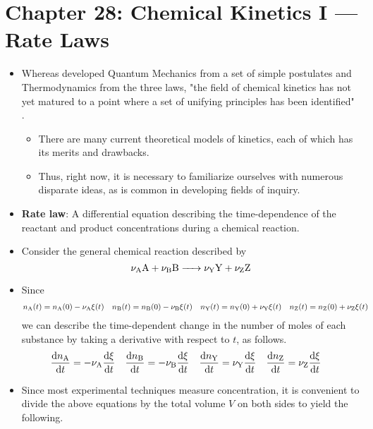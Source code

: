 \documentclass[../notes.tex]{subfiles}
\begin{document}
\section{Chapter 28: Chemical Kinetics I --- Rate Laws}
\begin{itemize}
    \item Whereas \textcite{bib:McQuarrieSimon} developed Quantum Mechanics from a set of simple postulates and Thermodynamics from the three laws, "the field of chemical kinetics has not yet matured to a point where a set of unifying principles has been identified" \parencite[1047]{bib:McQuarrieSimon}.
    \begin{itemize}
        \item There are many current theoretical models of kinetics, each of which has its merits and drawbacks.
        \item Thus, right now, it is necessary to familiarize ourselves with numerous disparate ideas, as is common in developing fields of inquiry.
    \end{itemize}
    \item \textbf{Rate law}: A differential equation describing the time-dependence of the reactant and product concentrations during a chemical reaction.
    \item Consider the general chemical reaction described by
    \begin{equation*}
        \ce{$\nu_{\text{A}}$A + $\nu_{\text{B}}$B -> $\nu_{\text{Y}}$Y + $\nu_{\text{Z}}$Z}
    \end{equation*}
    \item Since
    \begin{align*}
        n_{\ce{A}}(t) &= n_{\ce{A}}(0)-\nu_{\ce{A}}\xi(t)&
        n_{\ce{B}}(t) &= n_{\ce{B}}(0)-\nu_{\ce{B}}\xi(t)&
        n_{\ce{Y}}(t) &= n_{\ce{Y}}(0)+\nu_{\ce{Y}}\xi(t)&
        n_{\ce{Z}}(t) &= n_{\ce{Z}}(0)+\nu_{\ce{Z}}\xi(t)
    \end{align*}
    we can describe the time-dependent change in the number of moles of each substance by taking a derivative with respect to $t$, as follows.
    \begin{align*}
        \dv{n_{\ce{A}}}{t} &= -\nu_{\ce{A}}\dv{\xi}{t}&
        \dv{n_{\ce{B}}}{t} &= -\nu_{\ce{B}}\dv{\xi}{t}&
        \dv{n_{\ce{Y}}}{t} &= \nu_{\ce{Y}}\dv{\xi}{t}&
        \dv{n_{\ce{Z}}}{t} &= \nu_{\ce{Z}}\dv{\xi}{t}
    \end{align*}
    \item Since most experimental techniques measure concentration, it is convenient to divide the above equations by the total volume $V$ on both sides to yield the following.

\end{itemize}
\end{document}
